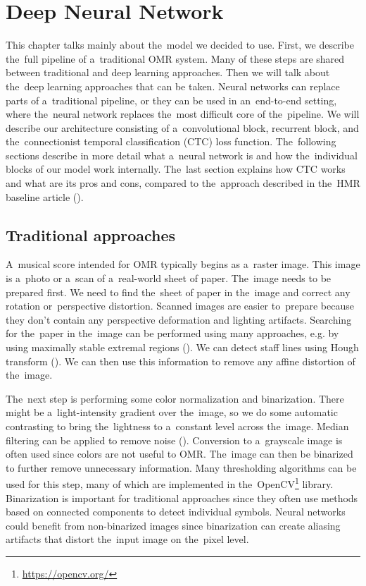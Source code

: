 \chapter{Deep Neural Network}
\label{chap:DeepNeuralNetwork}

This chapter talks mainly about the~model we decided to use. First, we describe the~full pipeline of a~traditional OMR system. Many of these steps are shared between traditional and deep learning approaches. Then we will talk about the~deep learning approaches that can be taken. Neural networks can replace parts of a~traditional pipeline, or they can be used in an~end-to-end setting, where the~neural network replaces the~most difficult core of the~pipeline. We will describe our architecture consisting of a~convolutional block, recurrent block, and the~connectionist temporal classification (CTC) loss function. The~following sections describe in more detail what a~neural network is and how the~individual blocks of our model work internally. The~last section explains how CTC works and what are its pros and cons, compared to the~approach described in the~HMR baseline article (\cite{HmrBaseline}).


\section{Traditional approaches}

A~musical score intended for OMR typically begins as a~raster image. This image is a~photo or a~scan of a~real-world sheet of paper. The~image needs to be prepared first. We need to find the~sheet of paper in the~image and correct any rotation or~perspective distortion. Scanned images are easier to~prepare because they don't contain any perspective deformation and lighting artifacts. Searching for the~paper in the~image can be performed using many approaches, e.g. by using maximally stable extremal regions (\cite{MSER}). We can detect staff lines using Hough transform (\cite{Hough}). We can then use this information to remove any affine distortion of the~image.

The~next step is performing some color normalization and binarization. There might be a~light-intensity gradient over the~image, so we do some automatic contrasting to bring the~lightness to a~constant level across the~image. Median filtering can be applied to remove noise (\cite{MedianFiltering}). Conversion to a~grayscale image is often used since colors are not useful to OMR. The~image can then be binarized to further remove unnecessary information. Many thresholding algorithms can be used for this step, many of which are implemented in the~OpenCV\footnote{\href{https://opencv.org/}{https://opencv.org/}} library. Binarization is important for traditional approaches since they often use methods based on connected components to detect individual symbols. Neural networks could benefit from non-binarized images since binarization can create aliasing artifacts that distort the~input image on the~pixel level.

